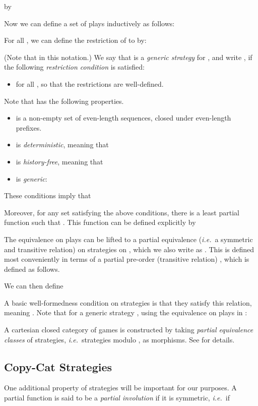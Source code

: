 \documentclass[a4paper,11pt]{article}
\newcommand{\ie}{\textit{i.e.}\ }
\begin{document}
by

Now we can define a set of plays 
inductively as follows:

For all , we can define the restriction of
 to  by:

(Note that
 in this notation.)
We say that  is a \emph{generic strategy} for , and write
, if the following \emph{restriction condition} is satisfied:
\begin{itemize}
\item  for all , so that the restrictions are well-defined.
\end{itemize}
Note that  has the following properties.
\begin{itemize}
\item  is a non-empty set of even-length sequences, closed
  under even-length prefixes.
\item  is \emph{deterministic}, meaning that

\item  is \emph{history-free}, meaning that

\item  is \emph{generic}:

\end{itemize}
These conditions imply that

Moreover, for any set  satisfying
the above conditions, there is a
least partial function  such that
. This function can be defined explicitly by


The equivalence  on plays can be lifted to a partial equivalence (\ie a symmetric and transitive relation) on strategies on , which we also write as . This is defined most conveniently in terms of a partial pre-order (transitive relation) , which is defined as follows.

We can then define

A basic well-formedness condition on strategies  is that they
satisfy this relation, meaning . Note that for
a generic strategy , using the
equivalence on plays in :

A cartesian closed category of games is constructed by taking \emph{partial equivalence classes} of strategies, \ie strategies modulo , as morphisms. See \cite{AJM00} for details.

\subsection{Copy-Cat Strategies}
One additional property of strategies will be important for
our purposes. A partial function  is said to be a
\emph{partial involution} if it is symmetric, \ie if
\end{document}
